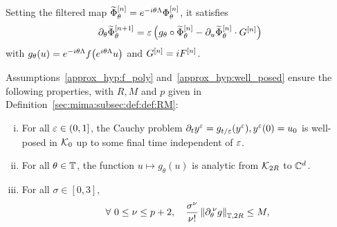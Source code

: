 \newcommand{\filtPhi}{\widetilde{\Phi}}
Setting the filtered map $\filtPhi\rk{n}_{\theta} = 
e^{-i\theta\Lambda} \Phi\rk{n}_{\theta}$, it satisfies 
\begin{equation} \label{sec:proofs:subsec:bounds:eq:diff_filtPhi} 
  \dptheta \filtPhi\rk{n+1}_{\theta} 
  = \e \left( g_{\theta} \circ \filtPhi\rk{n}_{\theta} 
  - \dpu \filtPhi\rk{n}_{\theta} \cdot G\rk{n} \right)
\end{equation}
with $g_{\theta}(u) = e^{-i\theta \Lambda} f \big( e^{i\theta\Lambda}u \big)$
and $G^{[n]} = i F^{[n]}$. 
%
\begin{property}
  \label{approx_prop:assump_perio}
  Assumptions~\ref{approx_hyp:f_poly} and~\ref{approx_hyp:well_posed}
  ensure the following properties, with $R, M$ and $p$ given in
  Definition~\ref{sec:mima:subsec:def:def:RM}: 
  \begin{enumerate}[(i)]
    \setlength{\itemsep}{0pt}
    \item For all $\varepsilon \in (0,1]$, the Cauchy problem $\partial_t y^{\varepsilon} = 
    g_{t/\varepsilon}(y^{\varepsilon}), y^{\varepsilon}(0) = u_0$ is well-posed in $\mathcal{K}_0$ up to some 
    final time independent of $\varepsilon$.
    \item For all $\theta \in \mathbb{T}$, the function $u \mapsto g_{\theta}(u) $
    is analytic from $\mathcal{K}_{2R}$ to $\mathbb{C}^d$.
    \item For all $\sigma \in [0, 3]$, 
    \begin{equation} \label{approx_def:cst_M}
      \forall\ 0\leq \nu \leq p+2, \quad \frac{\sigma^{\nu}}{\nu!} \left\| \partial_{\theta}^{\:\nu} g \right\|_{\mathbb{T}, 2R} \leq M , 
    \end{equation} 
  \end{enumerate} 
\end{property}

%

